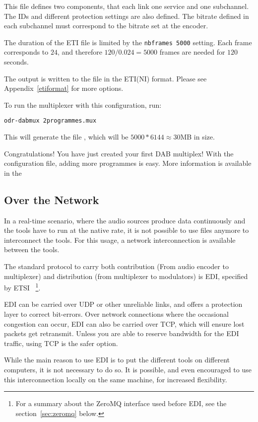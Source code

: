This file defines two components, that each link one service and one
subchannel. The IDs and different protection settings are also defined.
The bitrate defined in each subchannel must correspond to the bitrate set at
the encoder.

The duration of the ETI file is limited by the \lstinline{nbframes 5000}
setting. Each frame corresponds to $24$\ms, and therefore $120 / 0.024 = 5000$
frames are needed for $120$ seconds.

The output is written to the file  in the ETI(NI) format.
Please see Appendix~\ref{etiformat} for more options.

To run the multiplexer with this configuration, run:
\begin{lstlisting}
odr-dabmux 2programmes.mux
\end{lstlisting}

This will generate the file , which will be $5000 * 6144
\approx 30$\si{MB} in size.

Congratulations! You have just created your first DAB multiplex! With the
configuration file, adding more programmes is easy. More information is
available in the 

\subsection{Over the Network}
In a real-time scenario, where the audio sources produce data continuously and
the tools have to run at the native rate, it is not possible to use files
anymore to interconnect the tools. For this usage, a network interconnection is
available between the tools.

The standard protocol to carry both contribution (From audio encoder to
multiplexer) and distribution (from multiplexer to modulators) is
EDI, specified by ETSI~\cite{etsits102693}
\footnote{For a summary about the ZeroMQ interface used before EDI, see the
section~\ref{sec:zeromq} below.}.

EDI can be carried over UDP or other unreliable links, and offers a protection
layer to correct bit-errors. Over network connections where the occasional
congestion can occur, EDI can also be carried over TCP, which will ensure lost
packets get retransmit. Unless you are able to reserve bandwidth for the EDI
traffic, using TCP is the safer option.

While the main reason to use EDI is to put the different tools on different
computers, it is not necessary to do so.
It is possible, and even encouraged to use this interconnection locally on the
same machine, for increased flexibility.


